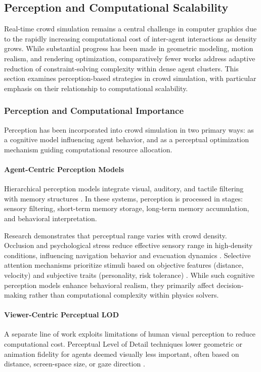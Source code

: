 \subsection{Perception and Computational Scalability}
\label{sec:perception}

Real-time crowd simulation remains a central challenge in computer graphics due to the rapidly increasing computational cost of inter-agent interactions as density grows. While substantial progress has been made in geometric modeling, motion realism, and rendering optimization, comparatively fewer works address adaptive reduction of constraint-solving complexity within dense agent clusters. This section examines perception-based strategies in crowd simulation, with particular emphasis on their relationship to computational scalability.

\subsubsection{Perception and Computational Importance}

Perception has been incorporated into crowd simulation in two primary ways: as a cognitive model influencing agent behavior, and as a perceptual optimization mechanism guiding computational resource allocation.

\paragraph{Agent-Centric Perception Models}
Hierarchical perception models integrate visual, auditory, and tactile filtering with memory structures \cite{Sun2008Hierarchical}. In these systems, perception is processed in stages: sensory filtering, short-term memory storage, long-term memory accumulation, and behavioral interpretation.

Research demonstrates that perceptual range varies with crowd density. Occlusion and psychological stress reduce effective sensory range in high-density conditions, influencing navigation behavior and evacuation dynamics \cite{Sun2008Hierarchical}. Selective attention mechanisms prioritize stimuli based on objective features (distance, velocity) and subjective traits (personality, risk tolerance) \cite{Macklin2014Unified, Sun2008Hierarchical}. While such cognitive perception models enhance behavioral realism, they primarily affect decision-making rather than computational complexity within physics solvers.

\paragraph{Viewer-Centric Perceptual LOD}
A separate line of work exploits limitations of human visual perception to reduce computational cost. Perceptual Level of Detail techniques lower geometric or animation fidelity for agents deemed visually less important, often based on distance, screen-space size, or gaze direction \cite{Reddy2001Perceptual}.

